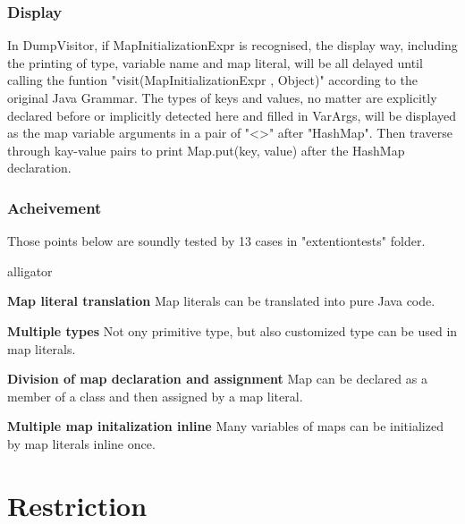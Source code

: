 	\subsubsection{Display}
	
	In DumpVisitor, if MapInitializationExpr is recognised, the display way, including the printing of type, variable name and map literal, will be all delayed until calling the funtion "visit(MapInitializationExpr , Object)" according to the original Java Grammar. The types of keys and values, no matter are explicitly declared before or implicitly detected here and filled in VarArgs, will be displayed as the map variable arguments in a pair of "<>" after "HashMap". Then traverse through kay-value pairs to print Map.put(key, value) after the HashMap declaration.
	
	\subsubsection{Acheivement}
	Those points below are soundly tested by 13 cases in "extentiontests" folder.
		\begin{labeling}{alligator}
			\item [\textbf{Map literal translation}] {Map literals can be translated into pure Java code.}
			\item [\textbf{Multiple types}] {Not ony primitive type, but also customized type can be used in map literals.}
			\item [\textbf{Division of map declaration and assignment}] {Map can be declared as a member of a class and then assigned by a map literal.}
			\item [\textbf{Multiple map initalization inline}] {Many variables of maps can be initialized by map literals inline once.}
		\end{labeling}
	 
	\section{Restriction}
	
	
	
